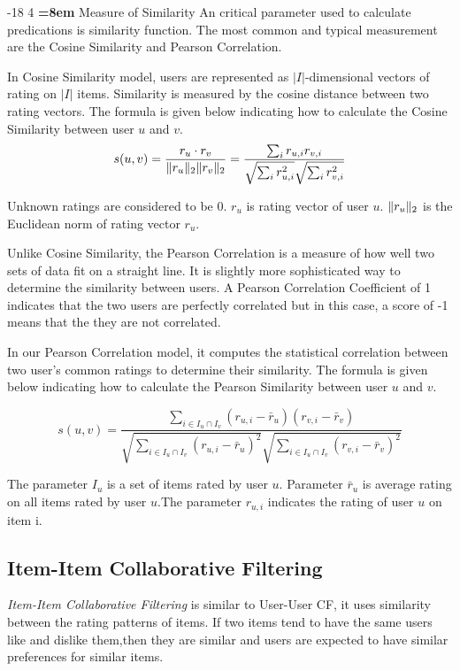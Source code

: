 \documentclass{llncs}
\makeatletter
\DeclarePairedDelimiter{\norm}{\lVert}{\rVert}
\renewcommand\subsubsection{\@startsection{subsubsection}{3}{\z@}%
	{-18\p@ \@plus -4\p@ \@minus -4\p@}%
	{4\p@ \@plus 2\p@ \@minus 2\p@}%
	{\normalfont\normalsize\bfseries\boldmath
		\rightskip=\z@ \@plus 8em\pretolerance=10000 }}
\makeatother
\begin{document}
\subsubsection{Measure of Similarity}
An critical parameter used to calculate predications is similarity function. The most common and typical measurement are the Cosine Similarity and Pearson Correlation. 

In Cosine Similarity model, users are represented as $|\textit{I}|$-dimensional vectors of rating on $|\textit{I}|$ items. Similarity is measured by the cosine distance between two rating vectors. The formula is given below indicating how to calculate the Cosine Similarity between user $u$ and $v$. 
\begin{equation}
s(u,v) = \frac{r_{u}\cdot r_{v}}{\norm {r_{u}}_{2} \norm {r_{v}}_{2}}=\frac{\sum\nolimits_{i} r_{u,i}r_{v,i}}{\sqrt{\sum\nolimits_{i} {r^{2}_{u,i}}} \sqrt{\sum\nolimits_{i} {r^{2}_{v,i}}}} 
\end{equation}

Unknown ratings are considered to be 0. $r_{u}$ is rating vector of user $u$. $\norm {r_{u}}_{2}$ is the Euclidean norm of rating vector $r_{u}$.

Unlike Cosine Similarity, the Pearson Correlation is a measure of how well two sets of data fit on a straight line. It is slightly more sophisticated way to determine the similarity between users. A Pearson Correlation Coefficient of 1 indicates that the two users are perfectly correlated but in this case, a score of -1 means that the they are not correlated.

In our Pearson Correlation model, it computes the statistical correlation between two user's common ratings to determine their similarity. The formula is given below indicating how to calculate the Pearson Similarity between user $u$ and $v$. 

\begin{equation}
	s(u,v) =\frac{{\sum\nolimits_{i \in {I_{u} \cap I_{v}}}(r_{u,i}-\bar{r}_{u})(r_{v,i}-\bar{r}_{v})}}{ \sqrt{{\sum\nolimits_{i \in {I_{u} \cap I_{v}}}(r_{u,i}-\bar{r}_{u})^2}} \sqrt{{\sum\nolimits_{i \in {I_{u} \cap I_{v}}}(r_{v,i}-\bar{r}_{v})^2}}}
\end{equation}

The parameter $I_{u}$ is a set of items rated by user $u$. Parameter ${\bar r_{u}}$ is average rating on all items rated by user $u$.The parameter $r_{u,i}$ indicates the rating of user $u$ on item i.

\subsection{Item-Item Collaborative Filtering}
\textit{Item-Item Collaborative Filtering} is similar to User-User CF, it uses similarity between the rating patterns of items. If two items tend to have the same users like and dislike them,then they are similar and users are expected to have similar preferences for similar items.
\end{document}
